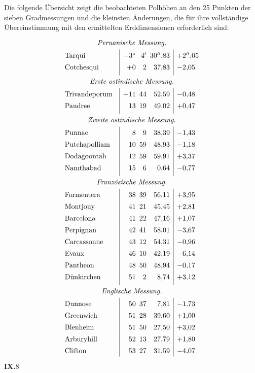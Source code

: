 Die folgende Übersicht zeigt die beobachteten Polhöhen an den 25 Punkten der
sieben Gradmessungen und die kleinsten Änderungen, die für ihre vollständige
Übereinstimmung mit den ermittelten Erddimensionen erforderlich sind:
\[
\renewcommand{\arraystretch}{1.38}
\begin{array}{@{}l@{\quad}|r@{\enspace}r@{\enspace}r|l@{}}
\multicolumn{5}{c}{\textit{Peruanische Messung.}}\\[.3ex]
\text{Tarqui}&-3^\circ&4'&30''{,}83&+2''{,}05\\
\text{Cotchesqui}&+0&2&37{,}83&-2{,}05\\[.8ex]
\multicolumn{5}{c}{\textit{Erste ostindische Messung.}}\\[.3ex]
\text{Trivandeporum}&+11&44&52{,}59&-0{,}48\\
\text{Paudree}&13&19&49{,}02&+0{,}47\\[.8ex]
\multicolumn{5}{c}{\textit{Zweite ostindische Messung.}}\\[.3ex]
\text{Punnae}&8&9&38{,}39&-1{,}43\\
\text{Putchapolliam}&10&59&48{,}93&-1{,}18\\
\text{Dodagoontah}&12&59&59{,}91&+3{,}37\\
\text{Namthabad}&15&6&0{,}64&-0{,}77\\[.8ex]
\multicolumn{5}{c}{\textit{Französische Messung.}}\\[.3ex]
\text{Formentera}&38&39&56{,}11&+3{,}95\\
\text{Montjouy}&41&21&45{,}45&+2{,}81\\
\text{Barcelona}&41&22&47{,}16&+1{,}07\\
\text{Perpignan}&42&41&58{,}01&-3{,}67\\
\text{Carcassonne}&43&12&54{,}31&-0{,}96\\
\text{Evaux}&46&10&42{,}19&-6{,}14\\
\text{Pantheon}&48&50&48{,}94&-0{,}17\\
\text{Dünkirchen}&51&2&8{,}74&+3{,}12\\[.8ex]
\multicolumn{5}{c}{\textit{Englische Messung.}}\\[.3ex]
\text{Dunnose}&50&37&7{,}81&-1{,}73\\
\text{Greenwich}&51&28&39{,}60&+1{,}00\\
\text{Blenheim}&51&50&27{,}50&+3{,}02\\
\text{Arburyhill}&52&13&27{,}79&+1{,}80\\
\text{Clifton}&53&27&31{,}59&-4{,}07
\end{array}
\]
\noindent\textbf{IX.}\hfill 8\hspace{.12\textwidth}\par

